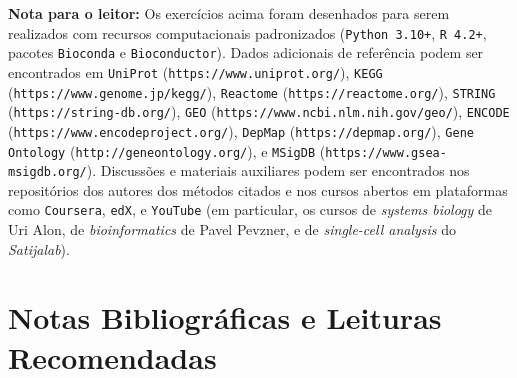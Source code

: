 \noindent\textbf{Nota para o leitor:} Os exercícios acima foram desenhados para serem realizados com recursos computacionais padronizados (\texttt{Python 3.10+}, \texttt{R 4.2+}, pacotes \texttt{Bioconda} e \texttt{Bioconductor}). Dados adicionais de referência podem ser encontrados em \texttt{UniProt} (\texttt{https://www.uniprot.org/}), \texttt{KEGG} (\texttt{https://www.genome.jp/kegg/}), \texttt{Reactome} (\texttt{https://reactome.org/}), \texttt{STRING} (\texttt{https://string-db.org/}), \texttt{GEO} (\texttt{https://www.ncbi.nlm.nih.gov/geo/}), \texttt{ENCODE} (\texttt{https://www.encodeproject.org/}), \texttt{DepMap} (\texttt{https://depmap.org/}), \texttt{Gene Ontology} (\texttt{http://geneontology.org/}), e \texttt{MSigDB} (\texttt{https://www.gsea-msigdb.org/}). Discussões e materiais auxiliares podem ser encontrados nos repositórios dos autores dos métodos citados e nos cursos abertos em plataformas como \texttt{Coursera}, \texttt{edX}, e \texttt{YouTube} (em particular, os cursos de \emph{systems biology} de Uri Alon, de \emph{bioinformatics} de Pavel Pevzner, e de \emph{single-cell analysis} do \emph{Satijalab}).



\section{Notas Bibliográficas e Leituras Recomendadas}
\label{sec:15-bibliograficas}

